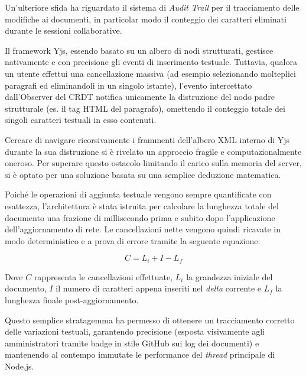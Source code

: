 \documentclass[11pt,a4paper]{report}
\begin{document}
Un'ulteriore sfida ha riguardato il sistema di \textit{Audit Trail} per il tracciamento delle modifiche ai documenti, in particolar modo il conteggio dei caratteri eliminati durante le sessioni collaborative.

Il framework Yjs, essendo basato su un albero di nodi strutturati, gestisce nativamente e con precisione gli eventi di inserimento testuale. Tuttavia, qualora un utente effettui una cancellazione massiva (ad esempio selezionando molteplici paragrafi ed eliminandoli in un singolo istante), l'evento intercettato dall'Observer del CRDT notifica unicamente la distruzione del nodo padre strutturale (es. il tag HTML del paragrafo), omettendo il conteggio totale dei singoli caratteri testuali in esso contenuti.

Cercare di navigare ricorsivamente i frammenti dell'albero XML interno di Yjs durante la sua distruzione si è rivelato un approccio fragile e computazionalmente oneroso. Per superare questo ostacolo limitando il carico sulla memoria del server, si è optato per una soluzione basata su una semplice deduzione matematica.

Poiché le operazioni di aggiunta testuale vengono sempre quantificate con esattezza, l'architettura è stata istruita per calcolare la lunghezza totale del documento una frazione di millisecondo prima e subito dopo l'applicazione dell'aggiornamento di rete. Le cancellazioni nette vengono quindi ricavate in modo deterministico e a prova di errore tramite la seguente equazione:

\begin{equation}
    C = L_i + I - L_f
\end{equation}

Dove $C$ rappresenta le cancellazioni effettuate, $L_i$ la grandezza iniziale del documento, $I$ il numero di caratteri appena inseriti nel \textit{delta} corrente e $L_f$ la lunghezza finale post-aggiornamento.

Questo semplice stratagemma ha permesso di ottenere un tracciamento corretto delle variazioni testuali, garantendo precisione (esposta visivamente agli amministratori tramite badge in stile GitHub sui log dei documenti) e mantenendo al contempo immutate le performance del \textit{thread} principale di Node.js.
\end{document}
